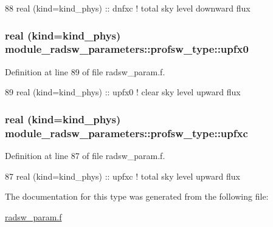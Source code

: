 \begin{DoxyCode}
88         \textcolor{keywordtype}{real (kind=kind\_phys)} :: dnfxc         \textcolor{comment}{! total sky level downward flux}
\end{DoxyCode}
\subsubsection[{\texorpdfstring{upfx0}{upfx0}}]{\setlength{\rightskip}{0pt plus 5cm}real (kind=kind\+\_\+phys) module\+\_\+radsw\+\_\+parameters\+::profsw\+\_\+type\+::upfx0}\hypertarget{structmodule__radsw__parameters_1_1profsw__type_aa9205ed3a95d61dd8e4e7184fd6da43e}{}\label{structmodule__radsw__parameters_1_1profsw__type_aa9205ed3a95d61dd8e4e7184fd6da43e}


Definition at line 89 of file radsw\+\_\+param.\+f.


\begin{DoxyCode}
89         \textcolor{keywordtype}{real (kind=kind\_phys)} :: upfx0         \textcolor{comment}{! clear sky level upward flux}
\end{DoxyCode}
\subsubsection[{\texorpdfstring{upfxc}{upfxc}}]{\setlength{\rightskip}{0pt plus 5cm}real (kind=kind\+\_\+phys) module\+\_\+radsw\+\_\+parameters\+::profsw\+\_\+type\+::upfxc}\hypertarget{structmodule__radsw__parameters_1_1profsw__type_a5122ef2eef4e86a7aadf77114da4b3e2}{}\label{structmodule__radsw__parameters_1_1profsw__type_a5122ef2eef4e86a7aadf77114da4b3e2}


Definition at line 87 of file radsw\+\_\+param.\+f.


\begin{DoxyCode}
87         \textcolor{keywordtype}{real (kind=kind\_phys)} :: upfxc         \textcolor{comment}{! total sky level upward flux}
\end{DoxyCode}


The documentation for this type was generated from the following file\+:\begin{DoxyCompactItemize}
\item 
\hyperlink{radsw__param_8f}{radsw\+\_\+param.\+f}\end{DoxyCompactItemize}
